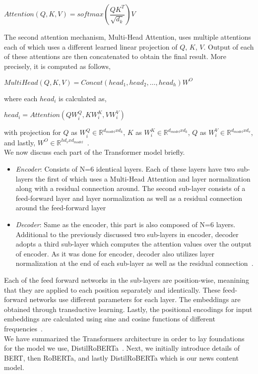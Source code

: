 \begin{center}
    $Attention(Q, K, V) = softmax(\dfrac{QK^T}{\sqrt{d_k}})V$
\end{center}
The second attention mechanism, Multi-Head Attention, uses multiple attentions each of which uses a different learned linear projection of $Q$, $K$, $V$. Output of each of these attentions are then concatenated to obtain the final result. More precisely, it is computed as follows,
\begin{center}
    $MultiHead(Q, K, V) = Concat(head_1, head_2, \dots, head_h)W^{O}$
\end{center}
where each $head_i$ is calculated as,
\begin{center}
    $head_i = Attention(QW_i^Q, KW_i^K, VW_i^V)$
\end{center}
with projection for $Q$ as $W_i^Q \in \mathbb{R}^{d_{model}xd_k}$, $K$ as $W_i^K \in \mathbb{R}^{d_{model}xd_k}$, $Q$
as $W_i^V \in \mathbb{R}^{d_{model}xd_v}$, and lastly, $W^{O} \in \mathbb{R}^{hd_vxd_{model}}$~\parencite{AttentionIsAllYouNeed_Vaswani}.\\
We now discuss each part of the Transformer model briefly.\\
\begin{itemize}
    \item \emph{Encoder}: Consists of N=6 identical layers. Each of these layers have two sub-layers the first of which uses a Multi-Head Attention and layer normalization~\parencite{LayerNorm_Ba} along with a residual connection around. The second sub-layer consists of a feed-forward layer and layer normalization as well as a residual connection~\parencite{ResidualConnection_He} around the feed-forward layer~\parencite{AttentionIsAllYouNeed_Vaswani}
    \item \emph{Decoder}: Same as the encoder, this part is also composed of N=6 layers. Additional to the previously discussed two sub-layers in encoder, decoder adopts a third sub-layer which computes the attention values over the output of encoder. As it was done for encoder, decoder also utilizes layer normalization at the end of each sub-layer as well as the residual connection~\parencite{AttentionIsAllYouNeed_Vaswani}.
\end{itemize}
Each of the feed forward networks in the sub-layers are position-wise, meanining that they are applied to each position separately and identically. These feed-forward networks use different parameters for each layer. The embeddings are obtained through transductive learning. Lastly, the positional encodings for input embeddings are calculated using sine and cosine functions of different frequencies~\parencite{AttentionIsAllYouNeed_Vaswani}.\\
We have summarized the Transformers architecture in order to lay foundations for the model we use, DistilRoBERTa~\parencite{DistilBERT_Sanh, RoBERTa_Liu}. Next, we initially introduce details of BERT, then RoBERTa, and lastly DistilRoBERTa which is our news content model.

